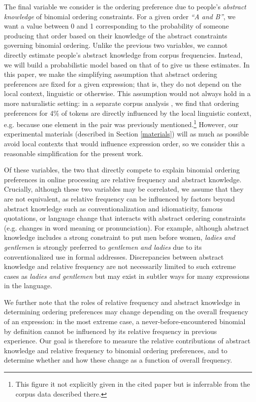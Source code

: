 \documentclass[authoryear]{elsarticle}
\begin{document}
The final variable we consider is the ordering preference due to people's \emph{abstract knowledge} of binomial ordering constraints. For a given order \emph{``A and B''}, we want a value between 0 and 1 corresponding to the probability of someone producing that order based on their knowledge of the abstract constraints governing binomial ordering. Unlike the previous two variables, we cannot directly estimate people's abstract knowledge from corpus frequencies. Instead, we will build a probabilistic model based on that of \citet{Benor:2006gv} to give us these estimates. In this paper, we make the simplifying assumption that abstract ordering preferences are fixed for a given expression; that is, they do not depend on the local context, linguistic or otherwise. This assumption would not always hold in a more naturalistic setting: in a separate corpus analysis \citep{Morgan:2015to}, we find that ordering preferences for 4\% of tokens are directly influenced by the local linguistic context, e.g. because one element in the pair was previously mentioned.\footnote{This figure it not explicitly given in the cited paper but is inferrable from the corpus data described there.} However, our experimental materials (described in Section \ref{materials}) will as much as possible avoid local contexts that would influence expression order, so we consider this a reasonable simplification for the present work.

Of these variables, the two that directly compete to explain binomial ordering preferences in online processing are relative frequency and abstract knowledge. Crucially, although these two variables may be correlated, we assume that they are not equivalent, as relative frequency can be influenced by factors beyond abstract knowledge such as conventionalization and idiomaticity, famous quotations, or language change that interacts with abstract ordering constraints (e.g. changes in word meaning or pronunciation). For example, although abstract knowledge includes a strong constraint to put men before women, \emph{ladies and gentlemen} is strongly preferred to \emph{gentlemen and ladies} due to its conventionalized use in formal addresses. Discrepancies between abstract knowledge and relative frequency are not necessarily limited to such extreme cases as \emph{ladies and gentlemen} but may exist in subtler ways for many expressions in the language.

We further note that the roles of relative frequency and abstract knowledge in determining ordering preferences may change depending on the overall frequency of an expression: in the most extreme case, a never-before-encountered binomial by definition cannot be influenced by its relative frequency in previous experience. Our goal is therefore to measure the relative contributions of abstract knowledge and relative frequency to binomial ordering preferences, and to determine whether and how these change as a function of overall frequency.
\end{document}
